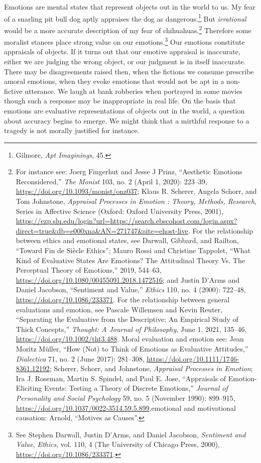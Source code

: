\documentclass[phdthesis,12pt,final]{wuthesis}
\theoremstyle{definition}
\theoremstyle{definition}
\theoremstyle{definition}
\theoremstyle{definition}
\theoremstyle{remark}
\begin{document}
Emotions are mental states that represent objects out in the world to us. My fear of a snarling pit bull dog aptly appraises the dog as dangerous.\footnote{Gilmore, \emph{Apt {Imaginings}}, 45.} But \emph{irrational} would be a more accurate description of my fear of chihuahuas.\footnote{For instance see: Joerg Fingerhut and Jesse J Prinz, {``Aesthetic Emotions Reconsidered,''} \emph{The Monist} 103, no. 2 (April 1, 2020): 223--39, \url{https://doi.org/10.1093/monist/onz037}; Klaus R. Scherer, Angela Schorr, and Tom Johnstone, \emph{Appraisal {Processes} in {Emotion} : {Theory}, {Methods}, {Research}}, Series in {Affective Science} (Oxford: Oxford University Press, 2001), \url{https://ezp.slu.edu/login?url=https://search.ebscohost.com/login.aspx?direct=true&db=e000xna&AN=271747&site=ehost-live}. For the relationship between ethics and emotional states, see Darwall, Gibbard, and Railton, {``Toward Fin de Siècle Ethics''}; Mauro Rossi and Christine Tappolet, {``What {Kind} of {Evaluative States Are Emotions}? {The Attitudinal Theory Vs}. {The Perceptual Theory} of {Emotions},''} 2019, 544--63, \url{https://doi.org/10.1080/00455091.2018.1472516}; and Justin D'Arms and Daniel Jacobson, {``Sentiment and {Value},''} \emph{Ethics} 110, no. 4 (2000): 722--48, \url{https://doi.org/10.1086/233371}. For the relationship between general evaluations and emotion, see Pascale Willemsen and Kevin Reuter, {``Separating the Evaluative from the Descriptive: {An} Empirical Study of Thick Concepts,''} \emph{Thought: A Journal of Philosophy}, June 1, 2021, 135--46, \url{https://doi.org/10.1002/tht3.488}. Moral evaluation and emotion see: Jean Moritz Müller, {``How ({Not}) to {Think} of {Emotions} as {Evaluative Attitudes},''} \emph{Dialectica} 71, no. 2 (June 2017): 281--308, \url{https://doi.org/10.1111/1746-8361.12192}; Scherer, Schorr, and Johnstone, \emph{Appraisal Processes in Emotion}; Ira J. Roseman, Martin S. Spindel, and Paul E. Jose, {``Appraisals of Emotion-Eliciting Events: {Testing} a Theory of Discrete Emotions,''} \emph{Journal of Personality and Social Psychology} 59, no. 5 (November 1990): 899--915, \url{https://doi.org/10.1037/0022-3514.59.5.899},emotional and motivational causation: Arnold, {``Motives as Causes''}.} Therefore some moralist stances place strong value on our emotions.\footnote{See Stephen Darwall, Justin D'Arms, and Daniel Jacobson, \emph{Sentiment and {Value}}, \emph{Ethics}, vol. 110, 4 (The University of Chicago Press, 2000), \url{https://doi.org/10.1086/233371}.} Our emotions constitute appraisals of objects. If it turns out that our emotive appraisal is inaccurate, either we are judging the wrong object, or our judgment is in itself inaccurate. There may be disagreements raised then, when the fictions we consume prescribe amoral emotions, when they evoke emotions that would not be apt in a non-fictive utterance. We laugh at bank robberies when portrayed in some movies though such a response may be inappropriate in real life. On the basis that emotions are evaluative representations of objects out in the world, a question about accuracy begins to emerge. We might think that a mirthful response to a tragedy is not morally justified for instance.
\end{document}
